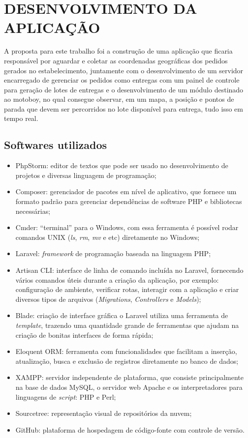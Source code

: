 
\chapter{DESENVOLVIMENTO DA APLICAÇÃO}
A proposta para este trabalho foi a construção de uma aplicação que ficaria responsável
por aguardar e coletar as coordenadas geográficas dos pedidos gerados no estabelecimento,
juntamente com o desenvolvimento de um servidor encarregado de gerenciar os pedidos como entregas
com um painel de controle para geração de lotes de entregas e o desenvolvimento de um módulo destinado ao motoboy, no qual consegue observar, em um mapa, a posição e pontos de parada que devem ser percorridos no lote disponível para entrega, tudo isso em tempo real.

\section{Softwares utilizados}

\begin{itemize}
    \item PhpStorm: editor de textos que pode ser usado no desenvolvimento de projetos e diversas linguagem de programação;
    \item Composer: gerenciador de pacotes em nível de aplicativo, que fornece um formato padrão para gerenciar dependências de software PHP e bibliotecas necessárias;
    \item Cmder: “terminal” para o Windows, com essa ferramenta é possível rodar comandos UNIX (\textit{ls}, \textit{rm}, \textit{mv} e etc) diretamente no Windows;
    \item Laravel: \textit{framework} de programação baseada na linguagem PHP;
    \item Artisan CLI: interface de linha de comando incluída no Laravel, fornecendo vários comandos úteis durante a criação da aplicação, por exemplo: configuração de ambiente, verificar rotas, interagir com a aplicação e criar diversos tipos de arquivos (\textit{Migrations}, \textit{Controllers} e \textit{Models});
    \item Blade: criação de interface gráfica o Laravel utiliza uma ferramenta de \textit{template}, trazendo uma quantidade grande de ferramentas que ajudam na criação de bonitas interfaces de forma rápida;
    \item Eloquent ORM: ferramenta com funcionalidades que facilitam a inserção, atualização, busca e exclusão de registros diretamente no banco de dados;
    \item XAMPP: servidor independente de plataforma, que consiste principalmente na base de dados MySQL, o servidor web Apache e os interpretadores para linguagens de \textit{script}: PHP e Perl;
    \item Sourcetree: representação visual de repositórios da nuvem;
    \item GitHub: plataforma de hospedagem de código-fonte com controle de versão.
\end{itemize}

